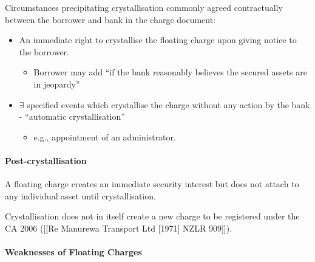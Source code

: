\documentclass[
]{article}
\newenvironment{Shaded}{}{}
\newcommand{\NormalTok}[1]{#1}
\providecommand{\tightlist}{%
  \setlength{\itemsep}{0pt}\setlength{\parskip}{0pt}}
\begin{document}
Circumstances precipitating crystallisation commonly agreed
contractually between the borrower and bank in the charge document:

\begin{itemize}
\tightlist
\item
  An immediate right to crystallise the floating charge upon giving
  notice to the borrower.

  \begin{itemize}
  \tightlist
  \item
    Borrower may add ``if the bank reasonably believes the secured
    assets are in jeopardy''
  \end{itemize}
\item
  \(\exists\) specified events which crystallise the charge without any
  action by the bank - ``automatic crystallisation''

  \begin{itemize}
  \tightlist
  \item
    e.g., appointment of an administrator.
  \end{itemize}
\end{itemize}

\hypertarget{post-crystallisation}{%
\paragraph{Post-crystallisation}\label{post-crystallisation}}

\begin{Shaded}
\begin{Highlighting}[]
\NormalTok{A floating charge creates an immediate security interest but does not attach to any individual asset until crystallisation. }
\end{Highlighting}
\end{Shaded}

Crystallisation does not in itself create a new charge to be registered
under the CA 2006 ({[}{[}Re Manurewa Transport Ltd {[}1971{]} NZLR
909{]}{]}).

\hypertarget{weaknesses-of-floating-charges}{%
\paragraph{Weaknesses of Floating
Charges}\label{weaknesses-of-floating-charges}}
\end{document}
